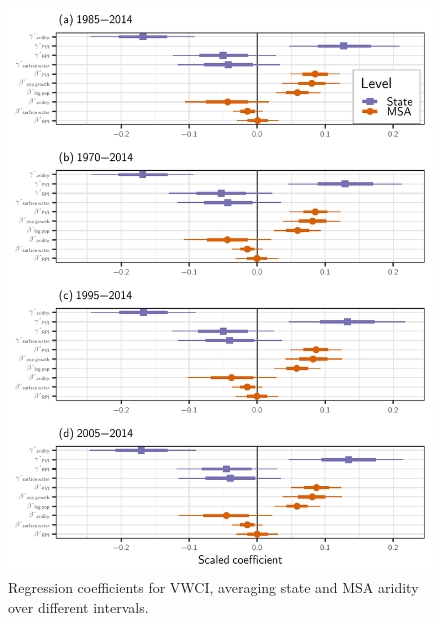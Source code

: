 \documentclass[draft]{agujournal}\usepackage{knitr}
\begin{document}
\begin{figure}
\includegraphics[width=6.25in]{figures_si/vwci_years_cat_plots-1} \caption[Regression coefficients for VWCI, averaging state and MSA aridity over different intervals]{Regression coefficients for VWCI, averaging state and MSA aridity over different intervals.}\label{fig:vwci_years_cat_plots}
\end{figure}



\end{document}
